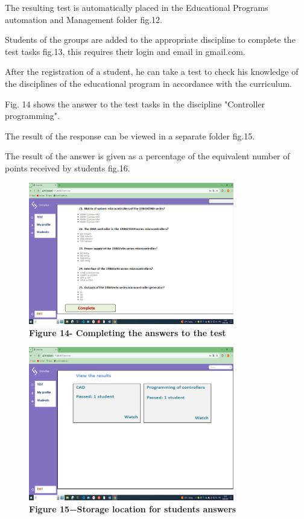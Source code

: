 \begin{multicols}{2}
The resulting test is automatically placed in the Educational Programs
automation and Management folder fig.12.

Students of the groups are added to the appropriate discipline to
complete the test tasks fig.13, this requires their login and email in
gmail.com.


After the registration of a student, he can take a test to check his
knowledge of the disciplines of the educational program in accordance
with the curriculum.

Fig. 14 shows the answer to the test tasks in the discipline "Controller
programming".


The result of the response can be viewed in a separate folder fig.15.

The result of the answer is given as a percentage of the equivalent
number of points received by students fig.16.
\end{multicols}


\begin{figure}[H]
	\centering
	\includegraphics[height=0.35\textwidth, width=0.8\textwidth]{assets/139}
	\caption*{\bfseries Figure 14- Completing the answers to the test}
\end{figure}



\begin{figure}[H]
	\centering
	\includegraphics[height=0.35\textwidth, width=0.8\textwidth]{assets/140}
	\caption*{\bfseries Figure 15−Storage location for students\textquotesingle{}
	answers}
\end{figure}



